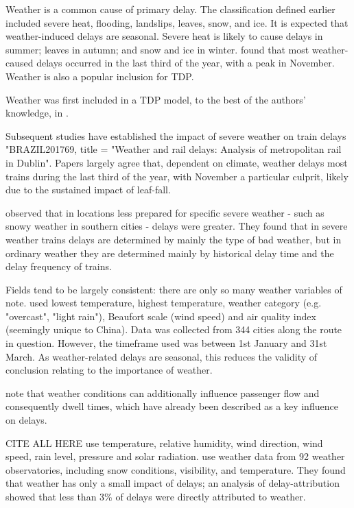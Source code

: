 \documentclass{article}
\begin{document}
Weather is a common cause of primary delay. The classification defined earlier included severe heat, flooding, landslips, leaves, snow, and ice. It is expected that weather-induced delays are seasonal. Severe heat is likely to cause delays in summer; leaves in autumn; and snow and ice in winter. \cite{brazil_2017} found that most weather-caused delays occurred in the last third of the year, with a peak in November. Weather is also a popular inclusion for TDP. 

Weather was first included in a TDP model, to the best of the authors' knowledge, in \cite{oneto_et_al_2016}.

Subsequent studies have established the impact of severe weather on train delays "BRAZIL201769, title = "Weather and rail delays: Analysis of metropolitan rail in Dublin".
Papers largely agree that, dependent on climate, weather delays most trains during the last third of the year, with November a particular culprit, likely due to the sustained impact of leaf-fall.

\cite{wang_et_al_2019} observed that in locations less prepared for specific severe weather - such as snowy weather in southern cities - delays were greater. They found that in severe weather trains delays are determined by mainly the type of bad weather, but in ordinary weather they are determined mainly by historical delay time and the delay frequency of trains. 

Fields tend to be largely consistent: there are only so many weather variables of note. \cite{wang_et_al_2019} used lowest temperature, highest temperature, weather category (e.g. "overcast", "light rain"), Beaufort scale (wind speed) and air quality index (seemingly unique to China). Data was collected from 344 cities along the route in question. However, the timeframe used was between 1st January and 31st March. As weather-related delays are seasonal, this reduces the validity of conclusion relating to the importance of weather. 

\cite{oneto_et_al_2016} note that weather conditions can additionally influence passenger flow and consequently dwell times, which have already been described as a key influence on delays. 


 \cite{oneto_et_al_2016} CITE ALL HERE use temperature, relative humidity, wind direction, wind speed, rain level, pressure and solar radiation.
\cite{nair_et_al_2019} use weather data from 92 weather observatories, including snow conditions, visibility, and temperature. They found that weather has only a small impact of delays; an analysis of delay-attribution showed that less than 3\% of delays were directly attributed to weather. 
\end{document}
